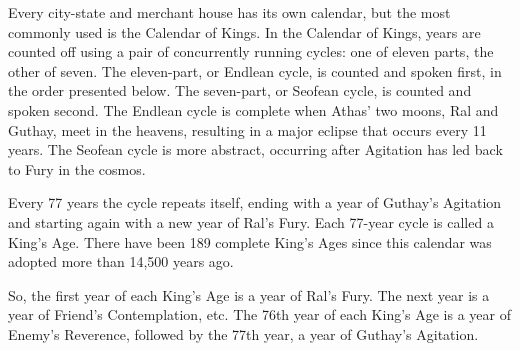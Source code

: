 Every city-state and merchant house has its own calendar, but the most commonly used is the Calendar of Kings. In the Calendar of Kings, years are counted off using a pair of concurrently running cycles: one of eleven parts, the other of seven. The eleven-part, or Endlean cycle, is counted and spoken first, in the order presented below. The seven-part, or Seofean cycle, is counted and spoken second. The Endlean cycle is complete when Athas' two moons, Ral and Guthay, meet in the heavens, resulting in a major eclipse that occurs every 11 years. The Seofean cycle is more abstract, occurring after Agitation has led back to Fury in the cosmos.

Every 77 years the cycle repeats itself, ending with a year of Guthay's Agitation and starting again with a new year of Ral's Fury. Each 77-year cycle is called a King's Age. There have been 189 complete King's Ages since this calendar was adopted more than 14,500 years ago.

So, the first year of each King's Age is a year of Ral's Fury. The next year is a year of Friend's Contemplation, etc. The 76th year of each King's Age is a year of Enemy's Reverence, followed by the 77th year, a year of Guthay's Agitation.


